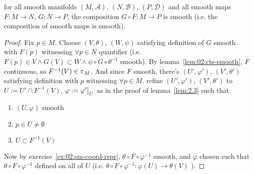 \begin{lem}\label{lem:2.3}
  for all smooth manifolds
  $(M,\mathscr A)$, $(N,\mathscr B)$, $(P,\mathscr D)$
  and all smooth maps
  $F:M\rightarrow N$, $G:N\rightarrow P$,
  the composition
  $G\circ F: M\rightarrow P$ is smooth
  (i.e. the composition of smooth maps is smooth).
\end{lem}
\begin{proof}
  Fix $p\in M$.  Choose
  $(V,\theta)$, $(W,\psi)$ satisfying definition of $G$ smooth
  with $F(p)$ witnessing $\forall p\in N$ quantifier
  (i.e.
  $F(p)\in V\land G(V)\subset W\land \psi\circ G\circ\theta^{-1}$
  smooth).
  By lemma~\ref{lem:02:cts-smooth}, $F$ continuous,
  so $F^{-1}(V)\in\operatorname{\tau}_M$. And since $F$ smooth, there's
  $(U',\varphi')$, $(V',\theta')$ satisfying definition with
  $p$ witnessing $\forall p\in M$.
  refine $(U',\varphi')$, $(V',\theta')$ to
  $U:=U'\cap F^{-1}(V)$, $\varphi:=\restr{\varphi'}{U}$
  as in the proof of lemma~\ref{lem:2.3}
  such that
  \begin{enumerate}[label=(\roman*)]
  \item $(U,\varphi)$ smooth
  \item $p\in U\neq\emptyset$
  \item $U\subset F^{-1}(V)$
  \end{enumerate}
  Now by exercise~\ref{ex:02:sm-coord-repr},
  $\theta\circ F\circ\varphi^{-1}$ smooth, and
  $\varphi$ chosen such that
  $\theta\circ F\circ\varphi^{-1}$ defined on all of $U$ (i.e.
  $\theta\circ F\circ\varphi^{-1}: \varphi(U)\rightarrow\theta(V)$
  ).
\end{proof}

